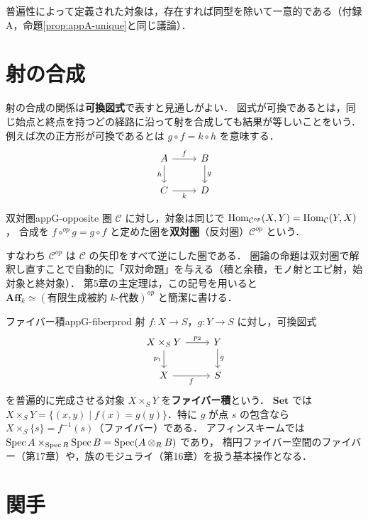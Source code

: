 普遍性によって定義された対象は，存在すれば同型を除いて一意的である（付録A，命題\ref{prop:appA-unique}と同じ議論）．

\section{射の合成}

射の合成の関係は\textbf{可換図式}で表すと見通しがよい．
図式が可換であるとは，同じ始点と終点を持つどの経路に沿って射を合成しても結果が等しいことをいう．
例えば次の正方形が可換であるとは $g\circ f=k\circ h$ を意味する．
\[
\begin{tikzcd}
A \arrow[r,"f"] \arrow[d,"h"'] & B \arrow[d,"g"]\\
C \arrow[r,"k"'] & D
\end{tikzcd}
\]

\begin{mydef}{双対圏}{appG-opposite}
圏 $\mathcal C$ に対し，対象は同じで $\operatorname{Hom}_{\mathcal C^{op}}(X,Y)=\operatorname{Hom}_{\mathcal C}(Y,X)$，
合成を $f\circ^{op}g=g\circ f$ と定めた圏を\textbf{双対圏}（反対圏）$\mathcal C^{op}$ という．
\end{mydef}

すなわち $\mathcal C^{op}$ は $\mathcal C$ の矢印をすべて逆にした圏である．
圏論の命題は双対圏で解釈し直すことで自動的に「双対命題」を与える（積と余積，モノ射とエピ射，始対象と終対象）．
第5章の主定理は，この記号を用いると $\mathbf{Aff}_k\simeq(\text{有限生成被約 }k\text{-代数})^{op}$ と簡潔に書ける．

\begin{myex}{ファイバー積}{appG-fiberprod}
射 $f\colon X\to S$，$g\colon Y\to S$ に対し，可換図式
\[
\begin{tikzcd}
X\times_SY \arrow[r,"p_2"] \arrow[d,"p_1"'] & Y \arrow[d,"g"]\\
X \arrow[r,"f"'] & S
\end{tikzcd}
\]
を普遍的に完成させる対象 $X\times_SY$ を\textbf{ファイバー積}という．
$\mathbf{Set}$ では $X\times_SY=\{(x,y)\mid f(x)=g(y)\}$．特に $g$ が点 $s$ の包含なら $X\times_S\{s\}=f^{-1}(s)$（ファイバー）である．
アフィンスキームでは $\operatorname{Spec} A\times_{\operatorname{Spec} R}\operatorname{Spec} B=\operatorname{Spec}(A\otimes_RB)$ であり，
楕円ファイバー空間のファイバー（第17章）や，族のモジュライ（第16章）を扱う基本操作となる．
\end{myex}

\section{関手}

